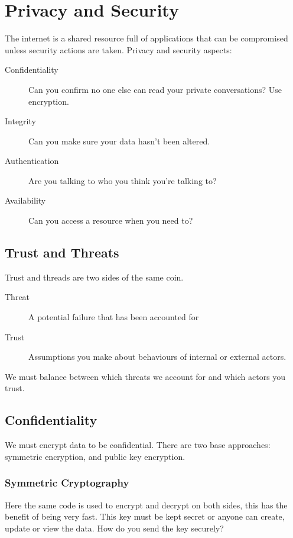 \section{Privacy and Security}\label{sec:privacy_and_security}

The internet is a shared resource full of applications that can be compromised unless security actions are taken.
Privacy and security aspects:
\begin{description}
    \item[Confidentiality] Can you confirm no one else can read your private conversations? Use encryption.
    \item[Integrity] Can you make sure your data hasn't been altered.
    \item[Authentication] Are you talking to who you think you're talking to?
    \item[Availability] Can you access a resource when you need to?
\end{description}

\subsection{Trust and Threats}\label{sub:trust_and_threats}

Trust and threads are two sides of the same coin.
\begin{description}
    \item[Threat] A potential failure that has been accounted for
    \item[Trust] Assumptions you make about behaviours of internal or external actors.
\end{description}
We must balance between which threats we account for and which actors you trust.

\subsection{Confidentiality}\label{sub:confidentility}

We must encrypt data to be confidential.
There are two base approaches: symmetric encryption, and public key encryption.

\subsubsection{Symmetric Cryptography}\label{ssub:symmetric_cryptography}

Here the same code is used to encrypt and decrypt on both sides, this has the benefit of being very fast.
This key must be kept secret or anyone can create, update or view the data.
How do you send the key securely?

